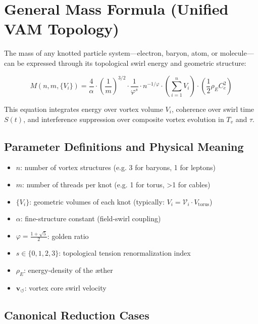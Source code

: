 \section{General Mass Formula (Unified VAM Topology)}\label{sec:master-mass-formula}

The mass of any knotted particle system—electron, baryon, atom, or molecule—can be expressed through its topological swirl energy and geometric structure:

\[
\boxed{
M(n, m, \{V_i\}) = \frac{4}{\alpha} \cdot \left( \frac{1}{m} \right)^{3/2} \cdot \frac{1}{\varphi^s} \cdot n^{-1/\varphi} \cdot \left( \sum_{i=1}^n V_i \right) \cdot \left( \frac{1}{2} \rho_{\scriptscriptstyle\boldsymbol\!E}C_e^2 \right)
}
\]

This equation integrates energy over vortex volume $V_i$, coherence over swirl time $S(t)$, and interference suppression over composite vortex evolution in $T_v$ and $\tau$.

\subsection{Parameter Definitions and Physical Meaning}

\begin{itemize}
  \item \( n \): number of vortex structures (e.g. 3 for baryons, 1 for leptons)
  \item \( m \): number of threads per knot (e.g. 1 for torus, >1 for cables)
  \item \( \{V_i\} \): geometric volumes of each knot (typically: \( V_i = \mathcal{V}_i \cdot V_{\text{torus}} \))
  \item \( \alpha \): fine-structure constant (field-swirl coupling)
  \item \( \varphi = \frac{1+\sqrt{5}}{2} \): golden ratio
  \item \( s \in \{0, 1, 2, 3\} \): topological tension renormalization index
  \item \( \rho_{\scriptscriptstyle\boldsymbol\!E}\): energy-density of the æther
  \item \( \mathbf{v}_{\scriptscriptstyle\boldsymbol{\circlearrowleft}} \): vortex core swirl velocity
\end{itemize}

\subsection{Canonical Reduction Cases}

